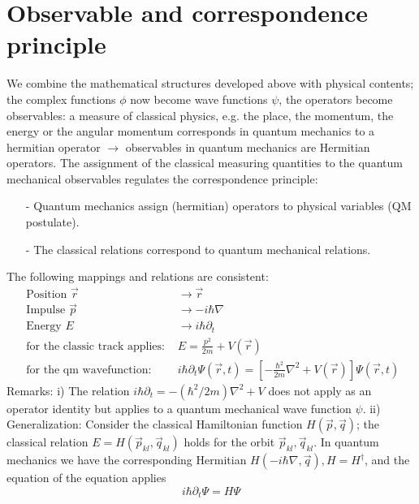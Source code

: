\section{Observable and correspondence principle}
We combine the mathematical structures developed above with physical contents; the complex functions $\phi$ now become wave functions $\psi$, the operators become observables: a measure of classical physics, e.g. the place, the momentum, the energy or the angular momentum corresponds in quantum mechanics to a hermitian operator $\to$ observables in quantum mechanics are Hermitian operators. The assignment of the classical measuring quantities to the quantum mechanical observables regulates the correspondence principle:
\begin{enumerate}
    \item[-] Quantum mechanics assign (hermitian) operators to physical variables (QM postulate).
    \item[-] The classical relations correspond to quantum mechanical relations.
\end{enumerate}
The following mappings and relations are consistent:
$$
\begin{array}{cl}{\text { Position } \vec{r}} & {\longrightarrow \vec{r}} \\ {\text { Impulse } \vec{p}} & {\longrightarrow-i \hbar \nabla} \\ {\text { Energy } E} & {\longrightarrow i \hbar \partial_{t}} \\ {\text { for the classic track applies: }} & {E=\frac{p^{2}}{2 m}+V(\vec{r})} \\ {\text { for the qm wavefunction: }} & {i \hbar \partial_{t} \Psi(\vec{r}, t)=\left[-\frac{\hbar^{2}}{2 m} \nabla^{2}+V(\vec{r})\right] \Psi(\vec{r}, t)}\end{array}
$$
Remarks: i) The relation $i\hbar\partial_t=-(\hbar^2/2m)\nabla^2+V$ does not apply as an operator identity but applies to a quantum mechanical wave function $\psi$. ii) Generalization: Consider the classical Hamiltonian function $H(\vec{p},\vec{q})$; the classical relation $E=H(\vec{p}_{kl},\vec{q}_{kl})$ holds for the orbit $\vec{p}_{kl},\vec{q}_{kl}$.
In quantum mechanics we have the corresponding Hermitian $H(-i\hbar\nabla,\vec{q}),H=H^{\dagger}$, and the equation of the equation applies
\begin{equation}
    i\hbar \partial_t\Psi=H\Psi
\end{equation}
